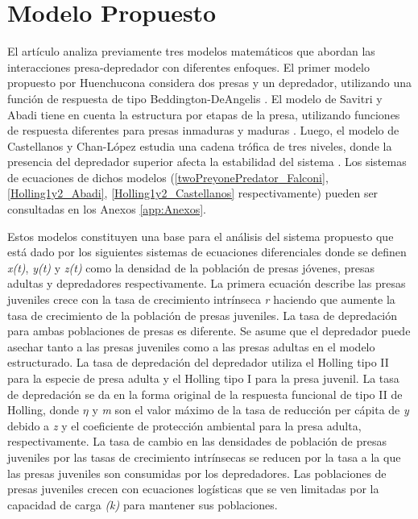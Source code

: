 \documentclass{wscpaperproc}
\theoremstyle{wsc}
\begin{document}
\section{Modelo Propuesto}

El artículo analiza previamente tres modelos matemáticos que abordan las interacciones presa-depredador con diferentes enfoques. El 
primer modelo propuesto por Huenchucona considera dos presas y un depredador, utilizando una 
función de respuesta de tipo Beddington-DeAngelis \cite{falconi_stability_2015}. El modelo de Savitri y Abadi tiene en cuenta la estructura 
por etapas de la presa, utilizando funciones de respuesta diferentes para presas inmaduras y maduras \cite{savitri_dynamics_2018}. Luego, el 
modelo de Castellanos y Chan-López estudia una cadena trófica de tres niveles, donde la presencia del depredador 
superior afecta la estabilidad del sistema \cite{castellanos_existence_2017}. Los sistemas de ecuaciones de dichos modelos (\ref{twoPreyonePredator_Falconi}, \ref{Holling1y2_Abadi}, 
\ref{Holling1y2_Castellanos} respectivamente) pueden ser consultadas en los Anexos \ref{app:Anexos}.\par

Estos modelos constituyen una base para el análisis 
del sistema propuesto que está dado por los siguientes sistemas de ecuaciones diferenciales donde se definen \emph{x(t)}, \emph{y(t)} y \emph{z(t)} como la 
densidad de la poblaci\'on de presas j\'ovenes, presas adultas y depredadores respectivamente.
La primera ecuación describe las presas juveniles crece con la tasa de crecimiento intrínseca \emph{r} haciendo que aumente la tasa de crecimiento de la población de 
presas juveniles. La tasa de depredación para ambas poblaciones de presas es diferente. Se asume que el depredador puede asechar 
tanto a las presas juveniles como a las presas adultas en el modelo estructurado. La tasa de depredación del depredador utiliza el Holling tipo II
para la especie de presa adulta y el Holling tipo I para la presa juvenil. La tasa de depredación se da en la forma original de la respuesta funcional 
de tipo II de Holling, donde $\eta$  y \emph{m} son el valor máximo de la tasa de reducción per cápita de \emph{y} debido a \emph{z} y el coeficiente 
de protección ambiental para la presa adulta, respectivamente. La tasa de cambio en las densidades de población de presas juveniles por las tasas de crecimiento intrínsecas se 
reducen por la tasa a la que las presas juveniles son consumidas por los depredadores. Las poblaciones de presas juveniles crecen con ecuaciones logísticas 
que se ven limitadas por la capacidad de carga \emph{(k)} para mantener sus poblaciones.\par
\end{document}
